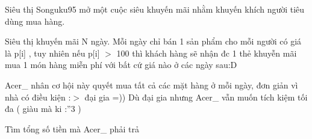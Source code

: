 Siêu thị Songuku95 mở một cuộc siêu khuyến mãi nhằm khuyến khích người tiêu dùng mua hàng.

Siêu thị khuyến mãi N ngày. Mỗi ngày chỉ bán 1 sản phẩm cho mỗi người có giá là p[i] , tuy nhiên nếu p[i] $>$ 100 thì khách hàng sẽ nhận đc 1 thẻ khuyễn mãi mua 1 món hàng miễn phí với bất cứ giá nào ở các ngày sau:D

Acer\_ nhân cơ hội này quyết mua tất cả các mặt hàng ở mỗi ngày, đơn giản vì nhà có điều kiện :$>$ đại gia =)) Dù đại gia nhưng Acer\_ vẫn muốn tích kiệm tối đa ( giàu mà ki :”3 )

Tìm tổng số tiền mà Acer\_ phải trả

\